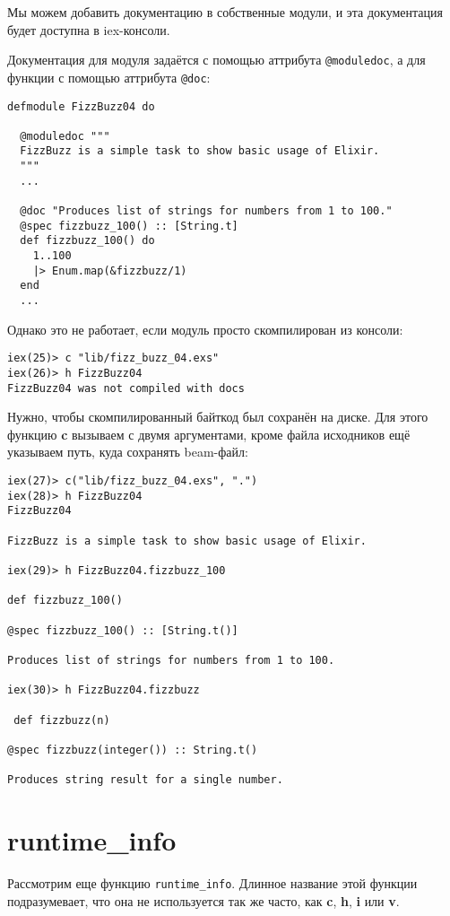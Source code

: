Мы можем добавить документацию в собственные модули, и эта документация будет доступна в iex-консоли. 

Документация для модуля задаётся с помощью аттрибута \texttt{@moduledoc}, а для функции с помощью аттрибута \texttt{@doc}:

\begin{lstlisting}
defmodule FizzBuzz04 do

  @moduledoc """
  FizzBuzz is a simple task to show basic usage of Elixir.
  """
  ...

  @doc "Produces list of strings for numbers from 1 to 100."
  @spec fizzbuzz_100() :: [String.t]
  def fizzbuzz_100() do
    1..100
    |> Enum.map(&fizzbuzz/1)
  end
  ...
\end{lstlisting}
Однако это не работает, если модуль просто скомпилирован из консоли:

\begin{lstlisting}
iex(25)> c "lib/fizz_buzz_04.exs"
iex(26)> h FizzBuzz04
FizzBuzz04 was not compiled with docs
\end{lstlisting}

Нужно, чтобы скомпилированный байткод был сохранён на диске. Для этого функцию \textbf{c} вызываем с двумя аргументами, кроме файла исходников ещё указываем путь, куда сохранять beam-файл:

\begin{lstlisting}
iex(27)> c("lib/fizz_buzz_04.exs", ".")
iex(28)> h FizzBuzz04
FizzBuzz04

FizzBuzz is a simple task to show basic usage of Elixir.

iex(29)> h FizzBuzz04.fizzbuzz_100

def fizzbuzz_100()

@spec fizzbuzz_100() :: [String.t()]

Produces list of strings for numbers from 1 to 100.

iex(30)> h FizzBuzz04.fizzbuzz

 def fizzbuzz(n)

@spec fizzbuzz(integer()) :: String.t()

Produces string result for a single number.
\end{lstlisting}

\section{runtime\_info}

Рассмотрим еще функцию \texttt{runtime\_info}. Длинное название этой функции подразумевает, что она не используется так же часто, как \textbf{c}, \textbf{h}, \textbf{i} или \textbf{v}.

